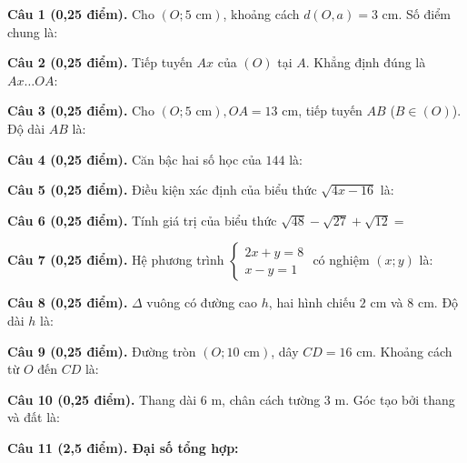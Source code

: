 \documentclass[12pt,a4paper]{article}
\begin{document}
\vspace{1.2mm}
\noindent\textbf{Câu 1 (0,25 điểm).} Cho $(O; 5\text{ cm})$, khoảng cách $d(O, a) = 3\text{ cm}$. Số điểm chung là: \par\vspace{0.5mm}
\noindent\textbf{Câu 2 (0,25 điểm).} Tiếp tuyến $Ax$ của $(O)$ tại $A$. Khẳng định đúng là $Ax \dots OA$: \shortans{\perp}\par\vspace{0.5mm}
\noindent\textbf{Câu 3 (0,25 điểm).} Cho $(O; 5\text{ cm}), OA = 13\text{ cm}$, tiếp tuyến $AB$ ($B \in (O)$). Độ dài $AB$ là: \par\vspace{0.5mm}
\noindent\textbf{Câu 4 (0,25 điểm).} Căn bậc hai số học của $144$ là: \par\vspace{0.5mm}
\noindent\textbf{Câu 5 (0,25 điểm).} Điều kiện xác định của biểu thức $\sqrt{4x - 16}$ là: \par\vspace{0.5mm}
\noindent\textbf{Câu 6 (0,25 điểm).} Tính giá trị của biểu thức $\sqrt{48} - \sqrt{27} + \sqrt{12} = $ \par\vspace{0.5mm}
\noindent\textbf{Câu 7 (0,25 điểm).} Hệ phương trình $\begin{cases} 2x + y = 8 \\ x - y = 1 \end{cases}$ có nghiệm $(x; y)$ là: \par\vspace{0.5mm}
\noindent\textbf{Câu 8 (0,25 điểm).} $\Delta$ vuông có đường cao $h$, hai hình chiếu $2\text{ cm}$ và $8\text{ cm}$. Độ dài $h$ là: \par\vspace{0.5mm}
\noindent\textbf{Câu 9 (0,25 điểm).} Đường tròn $(O; 10\text{ cm})$, dây $CD = 16\text{ cm}$. Khoảng cách từ $O$ đến $CD$ là: \par\vspace{0.5mm}
\noindent\textbf{Câu 10 (0,25 điểm).} Thang dài $6\text{ m}$, chân cách tường $3\text{ m}$. Góc tạo bởi thang và đất là: \par\vspace{0.5mm}
\vspace{0.8mm}
\noindent\textbf{Câu 11 (2,5 điểm). Đại số tổng hợp:}
\vspace{0.6mm}
\end{document}
